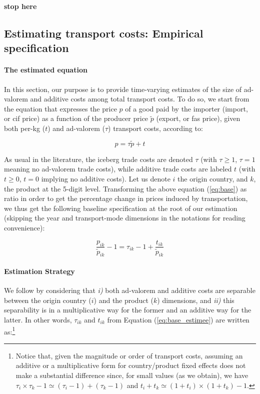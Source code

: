\documentclass[a4paper,11pt]{article}
\begin{document}
\textbf{stop here}

\subsection{Estimating transport costs: Empirical specification}

\paragraph{The estimated equation} In this section, our purpose is to provide time-varying estimates of the size of ad-valorem and additive costs among total transport costs. To do so, we start from the equation that expresses the price $p$ of a good paid by the importer (import, or cif price) as a function of the producer price $\widetilde{p}$ (export, or fas price), given both per-kg ($t$) and ad-valorem ($\tau$) transport costs, according to:

\begin{equation}
p = \tau \widetilde{p}+ t \label{eq:base}
\end{equation}

\noindent As usual in the literature, the iceberg trade costs are denoted $\tau$ (with  $\tau \geq 1$, $\tau=1$ meaning no ad-valorem trade costs), while additive trade costs are labeled $t$ (with $t \geq 0$, $t=0$ implying no additive costs).  Let us denote $i$ the origin country, and $k$, the product at the 5-digit level. Transforming the above equation (\ref{eq:base}) as ratio in order to get the percentage change in prices induced by transportation, we thus get the following baseline specification at the root of our estimation (skipping the year and transport-mode dimensions in the notations for reading convenience):

\begin{equation}
\frac{p_{ik}}{\widetilde{p}_{ik}} -1 = \tau_{ik} -1 +\frac{t_{ik}}{ \widetilde{p}_{ik}} \label{eq:base_estimee}
\end{equation}

\paragraph{Estimation Strategy} We follow \citet{Irrazabal_2015} by considering that \textit{i)} both ad-valorem and additive costs are separable between the origin country ($i$) and the product ($k$) dimensions, and \textit{ii)} this separability is in a multiplicative way for the former and an additive way for the latter. In other words, $\tau_{ik}$ and $t_{ik}$ from Equation (\ref{eq:base_estimee}) are written as:\footnote{Notice that, given the magnitude or order of transport costs, assuming an additive or a multiplicative form for country/product fixed effects does not make a substantial difference since, for small values (as we obtain), we have $\tau_i\times \tau_k -1 \simeq (\tau_i-1) + (\tau_k -1)$ and $t_i+t_k\simeq (1+t_i)\times(1+t_k)-1$.}
\end{document}
